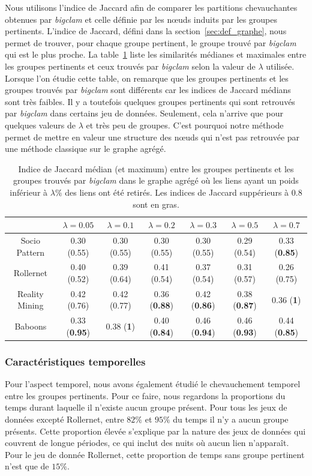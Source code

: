 Nous utilisons l'indice de Jaccard afin de comparer les partitions chevauchantes obtenues par \emph{bigclam} et celle définie par les n\oe uds induits par les groupes pertinents.
L'indice de Jaccard, défini dans la section~\ref{sec:def_graphe}, nous permet de trouver, pour chaque groupe pertinent, le groupe trouvé par \emph{bigclam} qui est le plus proche.
La table~\ref{tab:Jaccard} liste les similarités médianes et maximales entre les groupes pertinents et ceux trouvés par \emph{bigclam} selon la valeur de $\lambda$ utilisée.
Lorsque l'on étudie cette table, on remarque que les groupes pertinents et les groupes trouvés par \emph{bigclam} sont différents car les indices de Jaccard médians sont très faibles.
Il y a toutefois quelques groupes pertinents qui sont retrouvés par \emph{bigclam} dans certains jeu de données.
Seulement, cela n'arrive que pour quelques valeurs de $\lambda$ et très peu de groupes.
C'est pourquoi notre méthode permet de mettre en valeur une structure des n\oe uds qui n'est pas retrouvée par une méthode classique sur le graphe agrégé.

\begin{table}
\centering
\begin{tabular}{|c|c|c|c|c|c|c|}
\hline  \rule[-1ex]{0pt}{3.5ex}  & $\lambda= 0.05$ &$\lambda= 0.1$ & $\lambda=0.2$ & $\lambda=0.3$ & $\lambda=0.5$ & $\lambda=0.7$ \\ 
\hline Socio Pattern & 0.30 (0.55)  & 0.30 (0.55)  & 0.30 (0.55)  & 0.30 (0.55)  & 0.29 (0.54) & 0.33 (\textbf{0.85})  \\ 
\hline Rollernet & 0.40 (0.52) & 0.39 (0.64) & 0.41 (0.54) & 0.37 (0.54) & 0.31 (0.57)  &  0.26 (0.75) \\ 
\hline Reality Mining & 0.42 (0.76)  & 0.42 (0.77) & 0.36 (\textbf{0.88}) & 0.42 (\textbf{0.86}) & 0.38 (\textbf{0.87})  & 0.36 (\textbf{1}) \\ 
\hline Baboons & 0.33 (\textbf{0.95}) & 0.38 (\textbf{1}) & 0.40 (\textbf{0.84}) & 0.46 (\textbf{0.94}) & 0.46 (\textbf{0.93}) & 0.44 (\textbf{0.85}) \\ 
\hline 
\end{tabular} 
\caption{Indice de Jaccard médian (et maximum) entre les groupes pertinents et les groupes trouvés par \emph{bigclam} dans le graphe agrégé où les liens ayant un poids inférieur à $\lambda\%$ des liens ont été retirés.
Les indices de Jaccard suppérieurs à $0.8$ sont en gras.}
\label{tab:Jaccard}  
\end{table}

\subsubsection{Caractéristiques temporelles}
Pour l'aspect temporel, nous avons également étudié le chevauchement temporel entre les groupes pertinents.
Pour ce faire, nous regardons la proportions du temps durant laquelle il n'existe aucun groupe présent.
Pour tous les jeux de données excepté Rollernet, entre $82\%$ et $95\%$ du temps il n'y a aucun groupe présents.
Cette proportion élevée s'explique par la nature des jeux de données qui couvrent de longue périodes, ce qui inclut des nuits où aucun lien n'apparaît.
Pour le jeu de donnée Rollernet, cette proportion de temps sans groupe pertinent n'est que de $15\%$.

